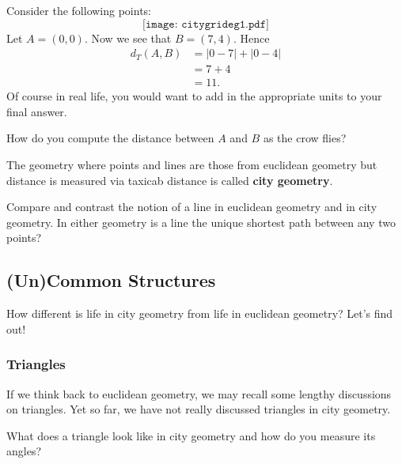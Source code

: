 \documentclass{ximera}
\begin{document}
\begin{example} Consider the following points:
\[
\texttt{[image: citygrideg1.pdf]}
\]
Let $A = (0,0)$. Now we see that $B = (7,4)$. Hence
\begin{align*}
d_T(A,B) &= |0 - 7| + |0-4|\\
&= 7 + 4 \\
&= 11.
\end{align*}
Of course in real life, you would want to add in the appropriate units
to your final answer.
\end{example}

\begin{question} How do you compute the distance between $A$ and $B$ as the crow flies?
\end{question}


\begin{definition}
The geometry where points and lines are those from euclidean geometry
but distance is measured via taxicab distance is called \textbf{city
  geometry}.
\end{definition}

\begin{question} Compare and contrast the notion of a line in euclidean geometry and in city geometry. In either geometry is a line the unique shortest path between any two points?
\end{question}




\subsection{(Un)Common Structures}

How different is life in city geometry from life in euclidean
geometry? Let's find out!

\subsubsection{Triangles}

If we think back to euclidean geometry, we
may recall some lengthy discussions on triangles. Yet so far, we have
not really discussed triangles in city geometry.

\begin{question} What does a triangle look like in city geometry and how do you measure its angles? 
\end{question}
\end{document}
